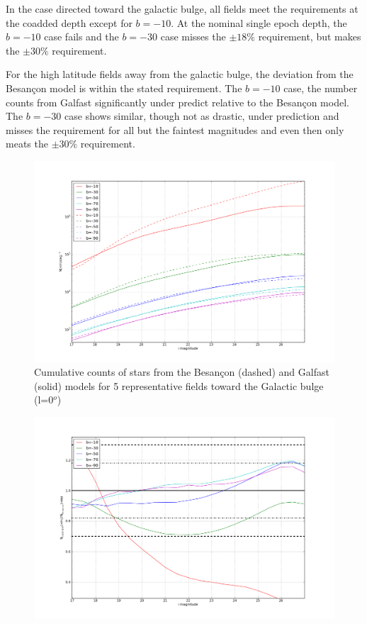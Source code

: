 \documentclass[]{article}
\begin{document}
{In the case directed toward the galactic bulge, all fields meet the requirements at the coadded depth except
for $b=-10$.  At the nominal single epoch depth, the $b=-10$ case fails and the $b=-30$ case misses the $\pm18\%$
requirement, but makes the $\pm30\%$ requirement.

For the high latitude fields away from the galactic bulge, the deviation from the Besan\c{c}on model is within 
the stated requirement.  The $b=-10$ case, the number counts from Galfast significantly under predict relative to 
the Besan\c{c}on model.  The $b=-30$ case shows similar, though not as drastic, under prediction and misses the 
requirement for all but the faintest magnitudes and even then only meats the $\pm30\%$ requirement.

\begin{figure}[H]
\centering
\includegraphics[width=5in]{validation_figures/cumulative_stars_0_besancon_dust.png}
\caption{Cumulative counts of stars from the Besan\c{c}on (dashed) and Galfast (solid) models for 5 representative fields toward the Galactic bulge (l=0$^o$) \label{fig:scounts_0}}
\end{figure}
\begin{figure}[H]
\centering
\includegraphics[width=5in]{validation_figures/cumulative_ratio_stars_0_besancon_dust.png}

\end{figure}}
\end{document}

